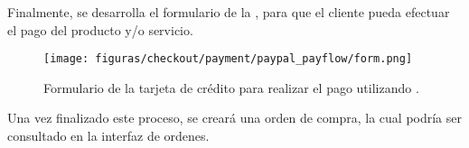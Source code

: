 		Finalmente, se desarrolla el formulario de la , para que el cliente pueda efectuar el pago del producto y/o servicio.

		\begin{figure}[H]
			\centering
			\texttt{[image: figuras/checkout/payment/paypal\_payflow/form.png]}
			\caption{Formulario de la tarjeta de crédito para realizar el pago utilizando \PPPaymentProNAME.}
			\label{figure:checkout:payment:paypal_payflow:form}
		\end{figure}

		Una vez finalizado este proceso, se creará una orden de compra, la cual podría ser consultado en la interfaz de ordenes.